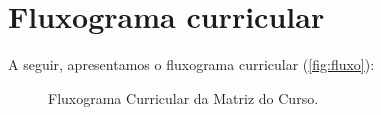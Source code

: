 \documentclass[
	12pt,				%
	openright,			%
	twoside,			%
	a4paper,			%
	chapter=TITLE,		%
	english,			%
	french,				%
	spanish,			%
	brazil,				%
	]{abntex2}
\begin{document}

\section{Fluxograma curricular}

A seguir, apresentamos o fluxograma curricular (\autoref{fig:fluxo}):
\begin{figure}[htpb]
   \caption{Fluxograma Curricular da Matriz do Curso.}
    \label{fig:fluxo}
\end{figure}

\color{black}
\end{document}
